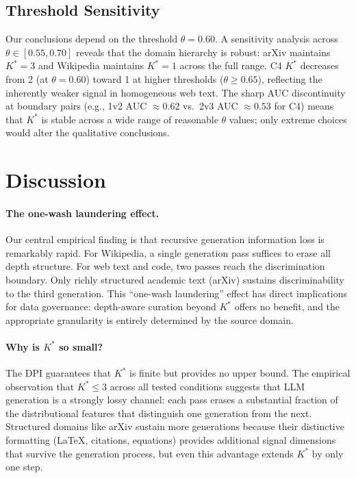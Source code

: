 \documentclass[11pt,a4paper]{article}
\newcommand{\kstar}{K^{*}}
\begin{document}
\subsection{Threshold Sensitivity}

Our conclusions depend on the threshold $\theta = 0.60$.
A sensitivity analysis across $\theta \in [0.55, 0.70]$ reveals that the domain hierarchy is robust: arXiv maintains $\kstar\!=\!3$ and Wikipedia maintains $\kstar\!=\!1$ across the full range.
C4 $\kstar$ decreases from 2 (at $\theta\!=\!0.60$) toward 1 at higher thresholds ($\theta \geq 0.65$), reflecting the inherently weaker signal in homogeneous web text.
The sharp AUC discontinuity at boundary pairs (e.g., 1v2 AUC $\approx 0.62$ vs.\ 2v3 AUC $\approx 0.53$ for C4) means that $\kstar$ is stable across a wide range of reasonable $\theta$ values; only extreme choices would alter the qualitative conclusions.

\section{Discussion}

\paragraph{The one-wash laundering effect.}
Our central empirical finding is that recursive generation information loss is remarkably rapid.
For Wikipedia, a single generation pass suffices to erase all depth structure.
For web text and code, two passes reach the discrimination boundary.
Only richly structured academic text (arXiv) sustains discriminability to the third generation.
This ``one-wash laundering'' effect has direct implications for data governance: depth-aware curation beyond $\kstar$ offers no benefit, and the appropriate granularity is entirely determined by the source domain.

\paragraph{Why is $\kstar$ so small?}
The DPI guarantees that $\kstar$ is finite but provides no upper bound.
The empirical observation that $\kstar \leq 3$ across all tested conditions suggests that LLM generation is a strongly lossy channel: each pass erases a substantial fraction of the distributional features that distinguish one generation from the next.
Structured domains like arXiv sustain more generations because their distinctive formatting (LaTeX, citations, equations) provides additional signal dimensions that survive the generation process, but even this advantage extends $\kstar$ by only one step.
\end{document}
